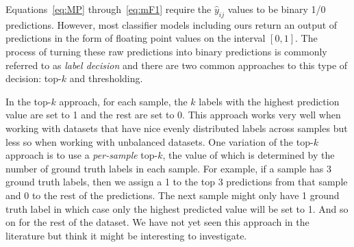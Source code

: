 \documentclass[12pt,journal,compsoc]{IEEEtran}
\begin{document}
Equations~\ref{eq:MP} through~\ref{eq:mF1} require the $\hat{y}_{ij}$ values to be binary 1/0 predictions.  However, most classifier models including ours return an output of predictions in the form of floating point values on the interval $[0,1]$. The process of turning these raw predictions into binary predictions is commonly referred to as \textit{label decision} and there are two common approaches to this type of decision: top-$k$ and thresholding.~\cite{Li2017a}


In the top-$k$ approach, for each sample, the $k$ labels with the highest prediction value are set to 1 and the rest are set to 0.  This approach works very well when working with datasets that have nice evenly distributed labels across samples but less so when working with unbalanced datasets. One variation of the top-$k$ approach is to use a \textit{per-sample} top-$k$, the value of which is determined by the number of ground truth labels in each sample.  For example, if a sample has 3 ground truth labels, then we assign a 1 to the top 3 predictions from that sample and 0 to the rest of the predictions.  The next sample might only have 1 ground truth label in which case only the highest predicted value will be set to 1.  And so on for the rest of the dataset.  We have not yet seen this approach in the literature but think it might be interesting to investigate.
\end{document}
